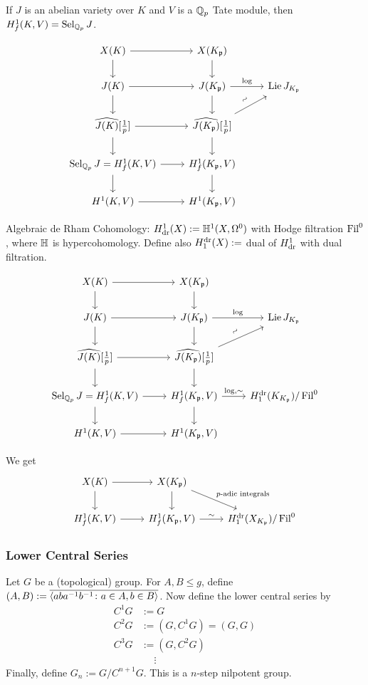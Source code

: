 \begin{rem}
If $J$ is an abelian variety over $K$ and $V$ is a $\mathbb{Q}_p$ Tate module, then $H_f^1(K,V)= \operatorname{Sel}_{\mathbb{Q}_p} J$. 
\end{rem}


	\[
	\begin{tikzcd}
	X(K) \arrow{d} \arrow{r} & X(K_\p) \arrow{d} \\
	J(K) \arrow{r} \arrow{d} & J(K_\p) \arrow{r}{\log} \arrow{d} & \lie J_{K_\p} \\
	\widehat{J(K)}[\frac{1}{p}] \arrow{r} \arrow{d} & \widehat{J(K_\p)}[\frac{1}{p}] \arrow{ur}{\rotatebox{45}{$\sim$}} \arrow{d} \\
	\sel_{\Q_p} J \arrow{d}= H_f^1(K,V) \arrow{r} &  H_f^1(K_\p,V) \arrow{d} \\
	H^1(K,V) \arrow{r} & H^1(K_\p,V)
	\end{tikzcd}
	\]


Algebraic de Rham Cohomology: $H_{\text{dr}}^1(X):= \mathbb{H}^1(X,\Omega^0)$ with Hodge filtration $\operatorname{Fil}^0$, where $\mathbb{H}$ is hypercohomology. Define also $H_1^{\text{dr}}(X):=$ dual of $H_{\text{dr}}^1$ with dual filtration. 


	\[
	\begin{tikzcd}
	X(K) \arrow{d} \arrow{r} & X(K_\p) \arrow{d} \\
	J(K) \arrow{r} \arrow{d} & J(K_\p) \arrow{r}{\log} \arrow{d} & \lie J_{K_\p} \\
	\widehat{J(K)}[\frac{1}{p}] \arrow{r} \arrow{d} & \widehat{J(K_\p)}[\frac{1}{p}] \arrow{ur}{\rotatebox{45}{$\sim$}} \arrow{d} \\
	\sel_{\Q_p} J \arrow{d}= H_f^1(K,V) \arrow{r} &  H_f^1(K_\p,V) \arrow{d} \arrow{r}{\log, \sim} &  H_1^\dr(K_{K_\p})/\Fil^0 \\
	H^1(K,V) \arrow{r} & H^1(K_\p,V)
	\end{tikzcd}
	\]


We get 
	\[
	\begin{tikzcd}
	X(K) \arrow{r} \arrow{d} & X(K_\p) \arrow{d} \arrow{dr}{p\text{-adic integrals}} \\
	H_f^1(K,V) \arrow{r} &  H_f^1(K_\p,V) \arrow{r}{\sim} & H_1^\dr(X_{K_\p})/\Fil^0
	\end{tikzcd}
	\]



\subsubsection{Lower Central Series}

Let $G$ be a (topological) group. For $A, B \leq g$, define $(A,B):= \overline{\langle aba^{-1}b^{-1} \colon a \in A, b \in B \rangle}$. Now define the lower central series by
	\[
	\begin{aligned}
	C^1G&:= G \\
	C^2G&:= (G,C^1G)= (G,G) \\
	C^3G&:= (G,C^2G) \\
	&\phantom{=}\vdots
	\end{aligned}
	\]
Finally, define $G_n:= G/C^{n+1}G$. This is a $n$-step nilpotent group. 


